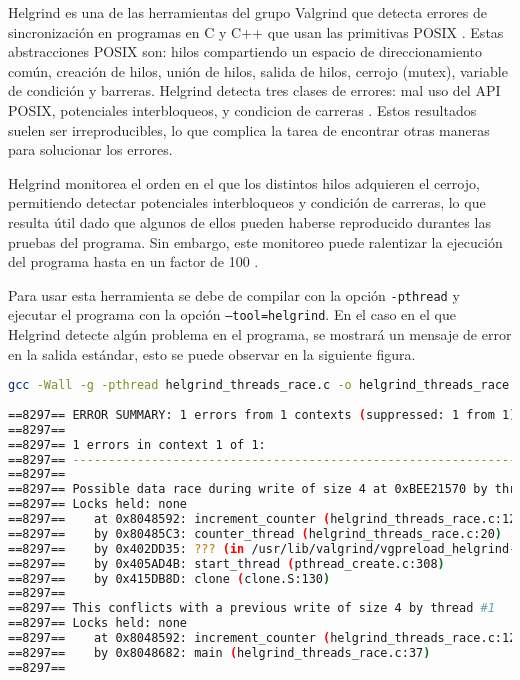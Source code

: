 Helgrind es una de las herramientas del grupo Valgrind que detecta errores de sincronización en programas en C y C++ que usan las primitivas POSIX \cite{POSIX}. Estas abstracciones POSIX son: \glspl{hilo} compartiendo un espacio de direccionamiento común, creación de \glspl{hilo}, unión de \glspl{hilo}, salida de \glspl{hilo}, \gls{cerrojo} (mutex), \gls{variable de condición} y \glspl{barrera}. Helgrind detecta tres clases de errores: mal uso del API POSIX, potenciales \glspl{interbloqueo}, y \glspl{condicion de carrera} \cite{Helgrind}. 
Estos resultados suelen ser irreproducibles, lo que complica la tarea de encontrar otras maneras para solucionar los errores.

Helgrind monitorea el orden en el que los distintos \glspl{hilo} adquieren el \gls{cerrojo}, permitiendo detectar potenciales \glspl{interbloqueo} y \glspl{condición de carrera}, lo que resulta útil dado que algunos de ellos pueden haberse reproducido durantes las pruebas del programa. Sin embargo, este monitoreo puede ralentizar la ejecución del programa hasta en un factor de 100 \cite{Helgrind}.

Para usar esta herramienta se debe de compilar con la opción \texttt{-pthread} y ejecutar el programa con la opción \texttt{--tool=helgrind}. En el caso en el que Helgrind detecte algún problema en el programa, se mostrará un mensaje de error en la \gls{salida estándar}, esto se puede observar en la siguiente figura.

\begin{lstlisting}[language=bash, caption={Muestra de salida de Helgrind al detectar un error de condición de carrera \cite{HelgrindUc3m}}]
gcc -Wall -g -pthread helgrind_threads_race.c -o helgrind_threads_race valgrind -v  --tool=helgrind  ./helgrind_threads_race
    
==8297== ERROR SUMMARY: 1 errors from 1 contexts (suppressed: 1 from 1)
==8297== 
==8297== 1 errors in context 1 of 1:
==8297== ----------------------------------------------------------------
==8297== 
==8297== Possible data race during write of size 4 at 0xBEE21570 by thread #2
==8297== Locks held: none
==8297==    at 0x8048592: increment_counter (helgrind_threads_race.c:12)
==8297==    by 0x80485C3: counter_thread (helgrind_threads_race.c:20)
==8297==    by 0x402DD35: ??? (in /usr/lib/valgrind/vgpreload_helgrind-x86-linux.so)
==8297==    by 0x405AD4B: start_thread (pthread_create.c:308)
==8297==    by 0x415DB8D: clone (clone.S:130)
==8297== 
==8297== This conflicts with a previous write of size 4 by thread #1
==8297== Locks held: none
==8297==    at 0x8048592: increment_counter (helgrind_threads_race.c:12)
==8297==    by 0x8048682: main (helgrind_threads_race.c:37)
==8297== 
\end{lstlisting}
    
